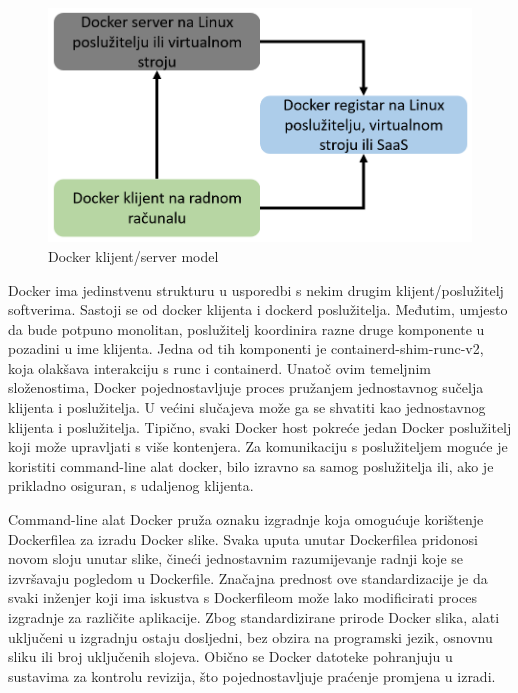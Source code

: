 \documentclass[a4paper,12pt,oneside]{article}
\begin{document}
\begin{figure}[ht!] %
	\centering %
	\includegraphics[scale=0.5]{./Slike/docker klijent-server model.png} %
	\caption{Docker klijent/server model \cite{kane2023docker} \label{f:docker klijent/server model}} %
\end{figure}

Docker ima jedinstvenu strukturu u usporedbi s nekim drugim klijent/poslužitelj softverima. Sastoji se od docker klijenta i dockerd poslužitelja. Međutim, umjesto da bude potpuno monolitan, poslužitelj koordinira razne druge komponente u pozadini u ime klijenta. Jedna od tih komponenti je containerd-shim-runc-v2, koja olakšava interakciju s runc i containerd. Unatoč ovim temeljnim složenostima, Docker pojednostavljuje proces pružanjem jednostavnog sučelja klijenta i poslužitelja. U većini slučajeva može ga se shvatiti kao jednostavnog klijenta i poslužitelja. Tipično, svaki Docker host pokreće jedan Docker poslužitelj koji može upravljati s više kontenjera. Za komunikaciju s poslužiteljem moguće je koristiti command-line alat docker, bilo izravno sa samog poslužitelja ili, ako je prikladno osiguran, s udaljenog klijenta.

Command-line alat Docker pruža oznaku izgradnje koja omogućuje korištenje Dockerfilea za izradu Docker slike. Svaka uputa unutar Dockerfilea pridonosi novom sloju unutar slike, čineći jednostavnim razumijevanje radnji koje se izvršavaju pogledom u Dockerfile. Značajna prednost ove standardizacije je da svaki inženjer koji ima iskustva s Dockerfileom može lako modificirati proces izgradnje za različite aplikacije. Zbog standardizirane prirode Docker slika, alati uključeni u izgradnju ostaju dosljedni, bez obzira na programski jezik, osnovnu sliku ili broj uključenih slojeva. Obično se Docker datoteke pohranjuju u sustavima za kontrolu revizija, što pojednostavljuje praćenje promjena u izradi.
\end{document}
